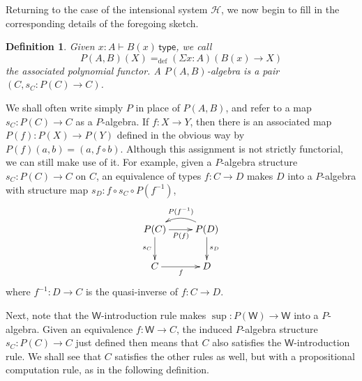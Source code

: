 \documentclass[10pt,a4paper,oneside,reqno]{amsart}
\numberwithin{equation}{section}
\theoremstyle{mythm}
\theoremstyle{mydef}
\newtheorem{definition}[theorem]{Definition}
\theoremstyle{myrmk}
\newtheorem{remark}[theorem]{Remark}
\newcommand{\defeq}{=_{\mathrm{def}}}
\newcommand{\Hint}{\mathcal{H}}
\newcommand{\type}{\mathsf{type}}
\newcommand{\W}{\mathsf{W}}
\newcommand{\Bool}{\mathsf{Bool}}
\begin{document}

Returning to the case of the intensional system $\Hint$, we now begin to fill in the corresponding details of the foregoing sketch.

\begin{definition}
Given $x:A \vdash B(x)\, \type$, we call $$P(A,B)(X) \defeq (\Sigma x:A) (B(x)\to X)$$ the associated \emph{polynomial functor}.  A \emph{$P(A,B)$-algebra} is a pair $(C, s_C: P(C) \to C)$.    
\end{definition}

We shall often write simply $P$ in place of $P(A,B)$, and refer to a map $s_C : P(C)\to C$ as a $P$-algebra.  
If $f : X\to Y$, then there is an associated map $P(f) : P(X)\to P(Y)$ defined in the obvious way by $P(f)(a, b) = (a,f\circ b)
$.  Although this assignment is not strictly functorial, we can still make use of it. For example, given a $P$-algebra structure $s_C :P(C)\to C$ on $C$, an equivalence of types $f : C \to D$ makes $D$ into a $P$-algebra with structure map $s_D : f\circ s_C\circ P(f^{-1})$,
  \[
\xymatrix{
P(C) \ar[d]_{s_C} \ar[r]_{P(f)} & \ar@/_1pc/[l]_{P(f^{-1})} P(D)  \ar[d]^{s_D}  \\
 C  \ar[r]_{f} & D
 }
 \]
 where $f^{-1} : D\to C$ is the quasi-inverse of $f : C\to D$.


 
Next, note that the $\W$-introduction rule makes $\sup : P(\W)\to \W$ into a $P$-algebra.  Given an equivalence  $f : \W \to C$, the induced $P$-algebra structure $s_C:P(C)\to C$ just defined then means that $C$ also satisfies the $\W$-introduction rule.  We shall see that $C$ satisfies the other rules as well, but with a propositional computation rule, as in the following definition.
\end{document}
